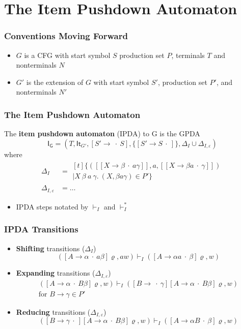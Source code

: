 \documentclass{beamer}
\newcommand{\concept}[1]{\textbf{#1}}
\newcommand{\It}[1]{\ensuremath{\mathsf{It}_{#1}}}
\newcommand{\cfitem}[3]{\ensuremath{{[#1 \to #2 \:\cdot\: #3]}}}
\newcommand{\ipda}{\ensuremath{\mathsf{{I}_G}}}
\begin{document}
\section{The Item Pushdown Automaton}

\begin{frame}
  \frametitle{Conventions Moving Forward}
  \begin{itemize}
    \item $G$ is a CFG with start symbol $S$ production set $P$, terminals $T$
    and nonterminals $N$
    \item $G'$ is the extension of $G$ with start symbol $S'$, production set $P'$,
    and nonterminals $N'$
  \end{itemize}
\end{frame}

\begin{frame}
  \frametitle{The Item Pushdown Automaton}
  \begin{definition}
    The \concept{item pushdown automaton} (IPDA) to G is the GPDA 
    \[ \ipda = (T, \It{G'}, \cfitem{S'}{}{S}, \{\cfitem{S'}{S}{}\},
      \varDelta_I \cup \varDelta_{I,\varepsilon}) \]
      where
    \begin{align*}
      \varDelta_I &=
    \begin{multlined}[t]
        \{([\cfitem{X}{\beta}{a \gamma}], a, [\cfitem{X}{\beta a}{\gamma}])\\
        \mid X\ \beta\ a\ \gamma.\ (X, \beta a \gamma) \in P'\}
    \end{multlined}\\
      \varDelta_{I,\varepsilon} &= \ldots
    \end{align*}
  \end{definition}
  \begin{itemize}
    \item IPDA steps notated by $\vdash_I$ and $\vdash^{*}_{I}$
  \end{itemize}
\end{frame}

\begin{frame}
  \frametitle{IPDA Transitions}
  \begin{itemize}
    \item \concept{Shifting} transitions ($\varDelta_I$)
    \[ (\cfitem{A}{\alpha}{a \beta} \varrho, aw) \vdash_{I} (\cfitem{A}{\alpha a}{\beta}\varrho, w) \]
    \item \concept{Expanding} transitions ($\varDelta_{I,\varepsilon}$)
    \begin{gather*}
    (\cfitem{A}{\alpha}{B \beta} \varrho, w) \vdash_{I} (\cfitem{B}{}{\gamma}
    \cfitem{A}{\alpha}{B \beta} \varrho, w)\\
    \text{for } B \rightarrow \gamma \in P'
    \end{gather*}
    \item \concept{Reducing} transitions ($\varDelta_{I,\varepsilon}$)
    \[(\cfitem{B}{\gamma}{} \cfitem{A}{\alpha}{B \beta} \varrho, w) \vdash_{I}
    (\cfitem{A}{\alpha B}{\beta} \varrho, w)\] 
  \end{itemize}
\end{frame}
\end{document}
